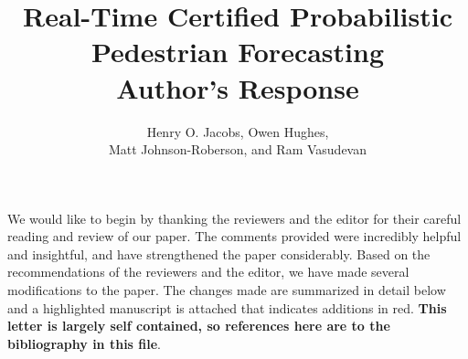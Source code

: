 \documentclass[usenames,dvipsnames]{article}
\title{\LARGE Real-Time Certified Probabilistic Pedestrian Forecasting \\ \textbf{Author's Response} }
\author{Henry O. Jacobs, Owen Hughes, \\ Matt Johnson-Roberson, and Ram Vasudevan }
\newcommand{\todo}[1]{\textcolor{red}{#1}}
\begin{document}
\maketitle


We would like to begin by thanking the reviewers and the editor for their careful reading and review of our paper.
The comments provided were incredibly helpful and insightful, and have strengthened the paper considerably.
Based on the recommendations of the reviewers and the editor, we have made several modifications to the paper.
The changes made are summarized in detail below and a highlighted manuscript is attached that indicates additions in red. \textbf{This letter is largely self contained, so references here are to the bibliography in this file}.
\end{document}
